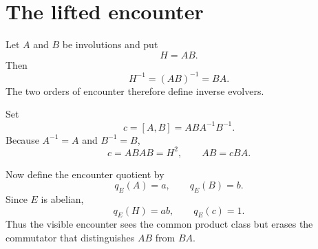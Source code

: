 \section{The lifted encounter}

Let \(A\) and \(B\) be involutions and put
\[
H=AB.
\]
Then
\[
H^{-1}=(AB)^{-1}=BA.
\]
The two orders of encounter therefore define inverse evolvers.

Set
\[
c=[A,B]=ABA^{-1}B^{-1}.
\]
Because \(A^{-1}=A\) and \(B^{-1}=B\),
\[
c=ABAB=H^2,
\qquad
AB=cBA.
\]

Now define the encounter quotient by
\[
q_E(A)=a,\qquad q_E(B)=b.
\]
Since \(E\) is abelian,
\[
q_E(H)=ab,\qquad q_E(c)=1.
\]
Thus the visible encounter sees the common product class but erases
the commutator that distinguishes \(AB\) from \(BA\).
